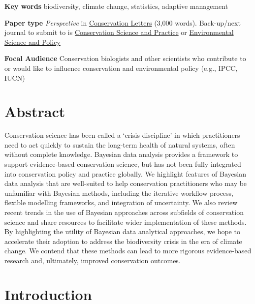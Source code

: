 \documentclass{article}
\begin{document}
\textbf{Key words} biodiversity, climate change, statistics, adaptive management


\textbf{Paper type} \textit{Perspective} in \href{https://conbio.onlinelibrary.wiley.com/hub/journal/1755263x/homepage/forauthors.html#ATypes}{Conservation Letters} (3,000 words). Back-up/next journal to submit to is \href{https://conbio.onlinelibrary.wiley.com/hub/journal/25784854/homepage/author-guidelines}{Conservation Science and Practice} or \href{https://www.sciencedirect.com/journal/environmental-science-and-policy/publish/guide-for-authors}{Environmental Science and Policy}

\textbf{Focal Audience} Conservation biologists and other scientists who contribute to or would like to influence conservation and environmental policy (e.g., IPCC, IUCN)




\section*{Abstract} 
Conservation science has been called a `crisis discipline' in which practitioners need to act quickly to sustain the long-term health of natural systems, often without complete knowledge. Bayesian data analysis provides a framework to support evidence-based conservation science, but has not been fully integrated into conservation policy and practice globally. We highlight features of Bayesian data analysis that are well-suited to help conservation practitioners who may be unfamiliar with Bayesian methods, including the iterative workflow process, flexible modelling frameworks, and integration of uncertainty. We also review recent trends in the use of Bayesian approaches across subfields of conservation science and share resources to facilitate wider implementation of these methods. By highlighting the utility of Bayesian data analytical approaches, we hope to accelerate their adoption to address the biodiversity crisis in the era of climate change. We contend that these methods can lead to more rigorous evidence-based research and, ultimately, improved conservation outcomes. 
\newpage
\section* {Introduction}
\end{document}
